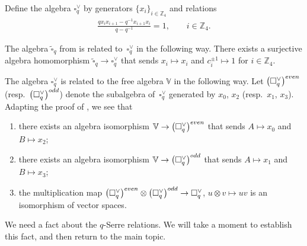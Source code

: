 \documentclass[11pt]{article}
\numberwithin{equation}{section}
\numberwithin{equation}{section}
\begin{document}
{\begin{Definition}\label{def:squarecheck} Define the algebra $\square^{\vee}_q$ by generators $\lbrace x_i\rbrace_{i \in \mathbb Z_4}$ and relations
\begin{gather}
\frac{q x_i x_{i+1} - q^{-1} x_{i+1} x_i}{q-q^{-1}} = 1, \qquad i \in \mathbb Z_4.\label{eq:checkrels}
\end{gather}
\end{Definition}
\begin{Note}\label{note:square}
The algebra $\widetilde \square_q$ from \cite[Definition~6.1]{pospart} is related to~$\square^{\vee}_q$
in the following way. There exists a surjective algebra homomorphism $\widetilde \square_q \to \square^\vee_q$ that sends $x_i \mapsto x_i $ and $c^{\pm 1}_i \mapsto 1$ for $i \in \mathbb Z_4$.
\end{Note}

The algebra $\square^\vee_q$ is related to the free algebra $\mathbb V$ in the following way. Let $\big(\square^\vee_q\big)^{\rm even}$ (resp.\ $\big(\square^\vee_q\big)^{\rm odd}$) denote the subalgebra of~$\square^\vee_q$ generated by $x_0$, $x_2$ (resp.~$x_1$, $x_3$). Adapting the proof of
\cite[Proposition~6.17]{pospart}, we see that
 \begin{enumerate}\itemsep=0pt
\item[\rm (i)]
 there exists an algebra isomorphism
 $\mathbb V \to \big(\square^\vee_q\big)^{\rm even}$ that sends
 $A\mapsto x_0$ and
 $B\mapsto x_2$;
 \item[\rm (ii)]
 there exists an algebra isomorphism
 $\mathbb V \to \big(\square^\vee_q\big)^{\rm odd}$ that sends
 $A\mapsto x_1$ and
 $B\mapsto x_3$;
 \item[\rm (iii)]
 the multiplication map
 $\big(\square^\vee_q\big)^{\rm even}
 \otimes
 \big(\square^\vee_q\big)^{\rm odd}
 \to \square^\vee_q$,
 $u \otimes v \mapsto uv$ is an isomorphism of vector spaces.
\end{enumerate}

We need a fact about the $q$-Serre relations. We will take a moment to establish this fact, and then return
to the main topic.

}
\end{document}

